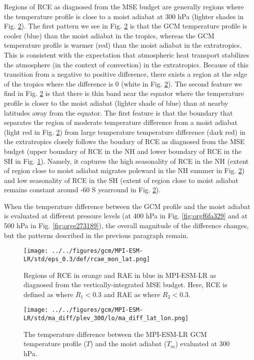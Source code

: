 \documentclass[11pt]{article}
\begin{document}
Regions of RCE as diagnosed from the MSE budget are generally regions where the temperature profile is close to a moist adiabat at 300 hPa (lighter shades in Fig. \ref{fig:org1b9c61d}). The first pattern we see in Fig. \ref{fig:org1b9c61d} is that the GCM temperature profile is cooler (blue) than the moist adiabat in the tropics, whereas the GCM temperature profile is warmer (red) than the moist adiabat in the extratropics. This is consistent with the expectation that atmospheric heat transport stabilizes the atmosphere (in the context of convection) in the extratropics. Because of this transition from a negative to positive difference, there exists a region at the edge of the tropics where the difference is 0 (white in Fig. \ref{fig:org1b9c61d}). The second feature we find in Fig. \ref{fig:org1b9c61d} is that there is thin band near the equator where the temperature profile is closer to the moist adiabat (lighter shade of blue) than at nearby latitudes away from the equator. The first feature is that the boundary that separates the region of moderate temperature difference from a moist adiabat (light red in Fig. \ref{fig:org1b9c61d}) from large temperature temperature difference (dark red) in the extratropics closely follows the boudary of RCE as diagnosed from the MSE budget (upper boundary of RCE in the NH and lower boundary of RCE in the SH in Fig. \ref{fig:org652d7a0}). Namely, it captures the high seasonality of RCE in the NH (extent of region close to moist adiabat migrates poleward in the NH summer in Fig. \ref{fig:org1b9c61d}) and low seasonality of RCE in the SH (extent of region close to moist adiabat remains constant around -60 S yearround in Fig. \ref{fig:org1b9c61d}).

When the temperature difference between the GCM profile and the moist adiabat is evaluated at different pressure levels (at 400 hPa in Fig. \ref{fig:orgf6fa329} and at 500 hPa in Fig. \ref{fig:orge273189}), the overall magnitude of the difference changes, but the patterns described in the previous paragraph remain.

\begin{figure}[htbp]
\centering
\texttt{[image: ../../figures/gcm/MPI-ESM-LR/std/eps\_0.3/def/rcae\_mon\_lat.png]}
\caption{\label{fig:org652d7a0}Regions of RCE in orange and RAE in blue in MPI-ESM-LR as diagnosed from the vertically-integrated MSE budget. Here, RCE is defined as where \(R_1 < 0.3\) and RAE as where \(R_2 < 0.3\).}
\end{figure}

\begin{figure}[htbp]
\centering
\texttt{[image: ../../figures/gcm/MPI-ESM-LR/std/ma\_diff/plev\_300/lo/ma\_diff\_lat\_lon.png]}
\caption{\label{fig:org1b9c61d}The temperature difference between the MPI-ESM-LR GCM temperature profile (\(T\)) and the moist adiabat (\(T_m\)) evaluated at 300 hPa.}
\end{figure}
\end{document}
